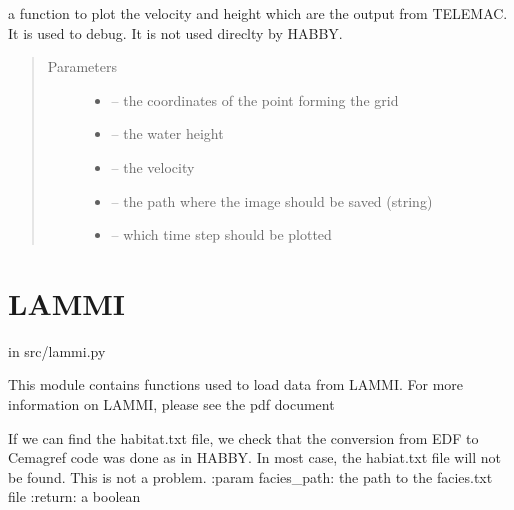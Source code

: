 \documentclass[letterpaper,10pt,english]{sphinxmanual}
\begin{document}

\begin{fulllineitems}
\label{\detokenize{index:src.selafin_habby1.plot_vel_h}}
a function to plot the velocity and height which are the output from TELEMAC. It is used to debug.
It is not used direclty by HABBY.
\begin{quote}\begin{description}
\item[{Parameters}] \leavevmode\begin{itemize}
\item {} 
 -- the coordinates of the point forming the grid

\item {} 
 -- the  water height

\item {} 
 -- the velocity

\item {} 
 -- the path where the image should be saved (string)

\item {} 
 -- which time step should be plotted

\end{itemize}

\end{description}\end{quote}

\end{fulllineitems}



\section{LAMMI}
\label{\detokenize{index:lammi}}
in src/lammi.py

This module contains functions used to load data from LAMMI. For more information on LAMMI, please see the pdf document 
\label{\detokenize{index:module-src.lammi}}

\begin{fulllineitems}
\label{\detokenize{index:src.lammi.check_code_change}}
If we can find the habitat.txt file, we check that the conversion from EDF to Cemagref code was done as in HABBY.
In most case, the habiat.txt file will not be found. This is not a problem.
:param facies\_path: the path to the facies.txt file
:return: a boolean

\end{fulllineitems}
\end{document}
